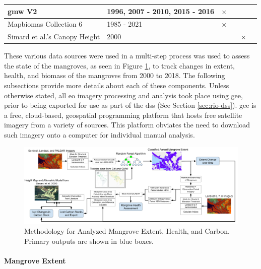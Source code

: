 \begin{table}[!htb]
\begin{center}
\begin{tabular}{| C{3cm} |  C{2cm} | C{2cm} | C{2cm} | C{2cm} | C{2cm} |}
\ac{gmw} V2 & 1996, 2007 - 2010, 2015 - 2016 & \textbf{$\times$} &  & & \cite{buntingGlobalMangroveWatch2018} \\ \hline

Mapbiomas Collection 6 & 1985 - 2021 & \textbf{$\times$} &  & & \cite{raisg-mapbiomasconsortiumMapBiomasAmazoniaProject2021} \\ \hline

Simard et al.'s Canopy Height & 2000 & & & \textbf{$\times$} & \cite{simardMangroveCanopyHeight2019} \\ \hline

\end{tabular}
\end{center}
\end{table}

These various data sources were used in a multi-step process was used to assess the state of the mangroves, as seen in Figure \ref{fig:extent_method}, to track changes in extent, health, and biomass of the mangroves from 2000 to 2018. The following subsections provide more details about each of these components. Unless otherwise stated, all \ac{eo} imagery processing and analysis took place using \acf{gee}, prior to being exported for use as part of the \ac{dss} (See Section \ref{sec:rio-dss}). \ac{gee} is a free, cloud-based, geospatial programming platform that hosts free satellite imagery from a variety of sources. This platform obviates the need to download such imagery onto a computer for individual manual analysis.

\begin{landscape}
\begin{figure}[t]
	\centering
	\includegraphics[scale=0.225]{Figures/chap4/extent_method.png}
	\caption[Mangrove Analysis Methodology]{Methodology for Analyzed Mangrove Extent, Health, and Carbon. Primary outputs are shown in blue boxes.}
	\label{fig:extent_method}
\end{figure}
\end{landscape}

\paragraph{Mangrove Extent} \label{sec:rio-mangrove-extent} \leavevmode\newline

